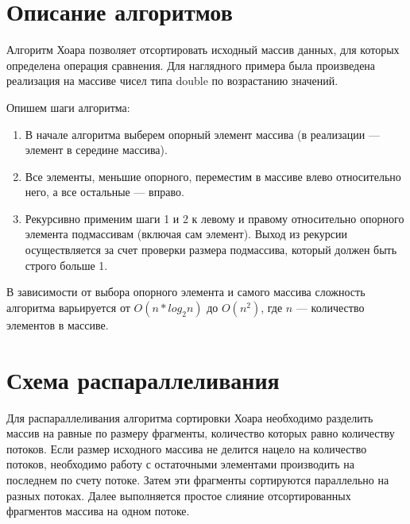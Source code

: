 \documentclass{report}
\begin{document}
\section*{Описание алгоритмов}
Алгоритм Хоара позволяет отсортировать исходный массив данных, для которых определена операция сравнения. Для наглядного примера была произведена реализация на массиве чисел типа double по возрастанию значений.
\par Опишем шаги алгоритма:
\begin{enumerate}
\item В начале алгоритма выберем опорный элемент массива (в реализации --- элемент в середине массива).
\item Все элементы, меньшие опорного, переместим в массиве влево относительно него, а все остальные --- вправо.
\item Рекурсивно применим шаги 1 и 2 к левому и правому относительно опорного элемента подмассивам (включая сам элемент). Выход из рекурсии осуществляется за счет проверки размера подмассива, который должен быть строго больше 1.
\end{enumerate}
\par В зависимости от выбора опорного элемента и самого массива сложность алгоритма варьируется от $ O(n*log_2{n})$ до $O(n^2)$, где $n$ --- количество элементов в массиве.

\newpage

\section*{Схема распараллеливания}
Для распараллеливания алгоритма сортировки Хоара необходимо разделить массив на равные по размеру фрагменты, количество которых равно количеству потоков. Если размер исходного массива не делится нацело на количество потоков, необходимо работу с остаточными элементами производить на последнем по счету потоке. Затем эти фрагменты сортируются параллельно на разных потоках. Далее выполняется простое слияние отсортированных фрагментов массива на одном потоке.

\newpage

\end{document}
